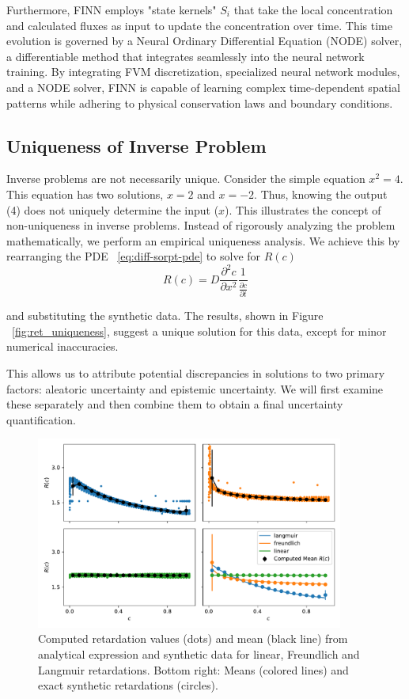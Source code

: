 Furthermore, FINN employs "state kernels" $S_i$ that take the local concentration and calculated fluxes as input to update the concentration over time. This time evolution is governed by a Neural Ordinary Differential Equation (NODE) solver, a differentiable method that integrates seamlessly into the neural network training. By integrating FVM discretization, specialized neural network modules, and a NODE solver, FINN is capable of learning complex time-dependent spatial patterns while adhering to physical conservation laws and boundary conditions.



\subsection{Uniqueness of Inverse Problem}
\label{sec:uniqueness}
Inverse problems are not necessarily unique. Consider the simple equation $x^2 = 4$. This equation has two solutions, $x=2$ and $x=-2$. Thus, knowing the output (4) does not uniquely determine the input ($x$). This illustrates the concept of non-uniqueness in inverse problems. Instead of rigorously analyzing the problem mathematically, we perform an empirical uniqueness analysis. We achieve this by rearranging the PDE ~\vref{eq:diff-sorpt-pde} to solve for $R(c)$
\begin{equation*}
    R(c) = D \frac{\partial^2 c}{\partial x^2} \frac{1}{\frac{\partial c}{\partial t}}
\end{equation*}

and substituting the synthetic data. The results, shown in Figure ~\vref{fig:ret_uniqueness}, suggest a unique solution for this data, except for minor numerical inaccuracies.

This allows us to attribute potential discrepancies in solutions to two primary factors: aleatoric uncertainty and epistemic uncertainty. We will first examine these separately and then combine them to obtain a final uncertainty quantification.


\begin{figure}
    \centering
    \includegraphics[width=0.9\textwidth]{figs/ret_uniqueness.pdf}
    \caption{Computed retardation values (dots) and mean (black line) from analytical expression and synthetic data for linear, Freundlich and Langmuir retardations. Bottom right: Means (colored lines) and exact synthetic retardations (circles).}
    \label{fig:ret_uniqueness}
\end{figure}


